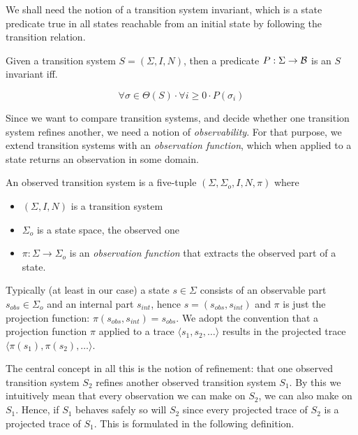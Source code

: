 \noindent
We shall need the notion of a  transition system invariant, which is
a state predicate true  in all states reachable  from an initial state
by following the transition relation.

\begin{definition}[Invariant]
\label{def-invariants}
Given a transition system $S = (\Sigma,I,N)$, then a predicate 
$P : \Sigma \rightarrow {\cal B}$ is an $S$ invariant iff.

\[
\forall \sigma \in \Theta(S) \cdot 
\forall i \ge 0 \cdot P(\sigma_i)
\]

\end{definition}

\noindent
Since we want to compare transition systems, and decide whether one transition
system refines another, we need a notion of {\em observability}.
For that purpose, we extend transition systems with an {\em observation 
function}, which when applied to a state returns an observation in some domain.

\begin{definition}
\label{def-observed-transition-system}  
An        observed  transition      system      is  a     five-tuple
$(\Sigma,\Sigma_o,I,N,\pi)$ where

\begin{itemize}

  \item $(\Sigma,I,N)$ is a transition system

  \item $\Sigma_o$ is a state space, the observed one

  \item $\pi : \Sigma \rightarrow \Sigma_o$ is an {\em observation function}
        that extracts the observed part of a state.

\end{itemize}
\end{definition}

\noindent
Typically (at least in our case) a state  $s \in \Sigma$ consists
of an   observable  part $s_{obs} \in \Sigma_o$  and  an  internal part
$s_{int}$, hence $s = (s_{obs},s_{int})$ and $\pi$ is just the
projection function: $\pi(s_{obs},s_{int}) = s_{obs}$.
We adopt the convention that a projection  function $\pi$ applied to a
trace $\langle s_1,  s_2, \ldots \rangle$ results in  the
projected trace $\langle \pi(s_1), \pi(s_2), \ldots \rangle$.

The central concept in all this is  the notion of refinement: that one
observed transition system  $S_2$ refines  another observed transition
system $S_1$.  By  this we intuitively mean  that every observation we
can make on  $S_2$,  we can  also make on   $S_1$.  Hence,  if  $S_1$
behaves safely so will $S_2$ since every projected  trace of $S_2$ is  a
projected trace  of $S_1$.  
This is formulated in the following definition.

